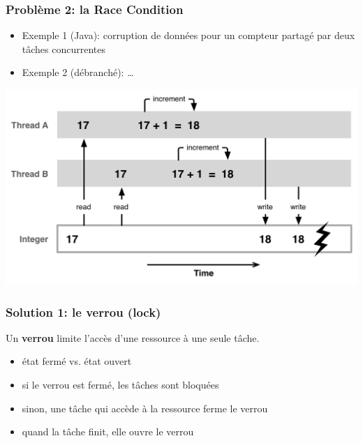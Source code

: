 \documentclass{beamer}
\begin{document}
\begin{frame} 
  \frametitle{Problème 2: la \textbf{Race Condition}}
  \begin{minipage}{.49\textwidth}
    \begin{itemize}
    \item Exemple 1 (Java): corruption de données pour un compteur partagé par
      deux tâches concurrentes
    \item Exemple 2 (débranché): \ldots
    \end{itemize}
  \end{minipage}
  \begin{minipage}{.49\textwidth}
    \includegraphics[width=.7\textwidth]{race-condition.png}
  \end{minipage}
\end{frame} %
\begin{frame}
  \frametitle{Solution 1: le \textbf{verrou} (lock)}
  Un \textbf{verrou} limite l'accès d'une ressource à une seule tâche.
  \begin{itemize}
  \item état fermé vs. état ouvert
  \item si le verrou est fermé, les tâches sont bloquées
  \item sinon, une tâche qui accède à la ressource ferme le verrou
  \item quand la tâche finit, elle ouvre le verrou
  \end{itemize}
\end{frame} %
\end{document}
